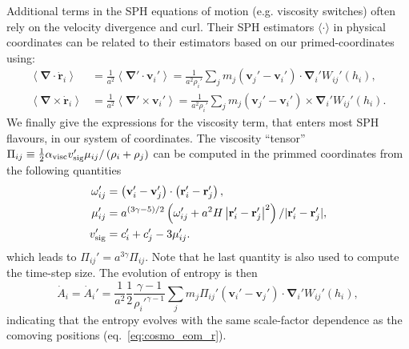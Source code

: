 Additional terms in the SPH equations of motion (e.g. viscosity
switches) often rely on the velocity divergence and curl. Their SPH
estimators $\langle\cdot\rangle$ in physical coordinates can be
related to their estimators based on our primed-coordinates using:
\begin{align}
  \left\langle \mathbf{\nabla}\cdot\dot{\mathbf{r}}_i \right\rangle &=
  \frac{1}{a^2} \left\langle
  \mathbf{\nabla}'\cdot\mathbf{v}_i'\right\rangle =
  \frac{1}{a^2\rho_i'}\sum_j m_j\left(\mathbf{v}_j' -
  \mathbf{v}_i'\right) \cdot \mathbf{\nabla}_i'W_{ij}'(h_i), \nonumber \\
  \left\langle \mathbf{\nabla}\times\dot{\mathbf{r}}_i \right\rangle &=
  \frac{1}{a^2} \left\langle
  \mathbf{\nabla}'\times\mathbf{v}_i'\right\rangle =
  \frac{1}{a^2\rho_i'}\sum_j m_j\left(\mathbf{v}_j' -
  \mathbf{v}_i'\right) \times \mathbf{\nabla}_i'W_{ij}'(h_i). \nonumber
\end{align}
We finally give the expressions for the \cite{Monaghan1997} viscosity
term, that enters most SPH flavours, in our system of coordinates. The
viscosity ``tensor'' $\Pi_{ij} \equiv \frac{1}{2}\alpha_{\rm visc} v_{\rm
    sig}'\mu_{ij}/\left(\rho_i + \rho_j\right)$ can be computed
  in the primmed coordinates from the following quantities
\begin{align}
  \omega_{ij}' &= \left(\mathbf{v}_i' - \mathbf{v}_j'\right) \cdot
  \left(\mathbf{r}_i' - \mathbf{r}_j'\right), \\
  \mu_{ij}' &=
  a^{(3\gamma-5)/2} \left(\omega_{ij}' + a^2H\left|\mathbf{r}_i' -
  \mathbf{r}_j'\right|^2 \right) / |\mathbf{r}_i' - \mathbf{r}_j' |,
  \\
  v_{\rm sig}' &= c_i' + c_j' - 3 \mu_{ij}'.
\end{align}
which leads to $\Pi_{ij}'=a^{3\gamma}\Pi_{ij}$. Note that he last quantity is
also used to compute the time-step size. The evolution of entropy is
then
\begin{equation}
  \dot{A}_i = \dot{A}_i' = \frac{1}{a^2}\frac{1}{2}\frac{\gamma-1}{\rho_i'^{\gamma-1}} \sum_j
  m_j \Pi_{ij}' \left(\mathbf{v}_i' -
  \mathbf{v}_j'\right)\cdot\mathbf{\nabla}_i'W_{ij}'(h_i),
\end{equation}
indicating that the entropy evolves with the same scale-factor
dependence as the comoving positions (eq.~\ref{eq:cosmo_eom_r}).
